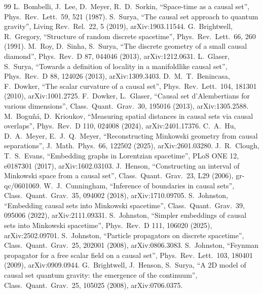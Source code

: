 \documentclass[11pt,a4paper]{article}
\begin{document}
\begin{thebibliography}{99}\small
{} L.~Bombelli, J.~Lee, D.~Meyer, R.~D.~Sorkin, ``Space-time as a causal set'', Phys.\ Rev.\ Lett.\ 59, 521 (1987).
 S.~Surya, ``The causal set approach to quantum gravity'', Living Rev.\ Rel.\ 22, 5 (2019), arXiv:1903.11544.
 G.~Brightwell, R.~Gregory, ``Structure of random discrete spacetime'', Phys.\ Rev.\ Lett.\ 66, 260 (1991).
 M.~Roy, D.~Sinha, S.~Surya, ``The discrete geometry of a small causal diamond'', Phys.\ Rev.\ D 87, 044046 (2013), arXiv:1212.0631.
 L.~Glaser, S.~Surya, ``Towards a definition of locality in a manifoldlike causal set'', Phys.\ Rev.\ D 88, 124026 (2013), arXiv:1309.3403.
 D.~M.~T.~Benincasa, F.~Dowker, ``The scalar curvature of a causal set'', Phys.\ Rev.\ Lett.\ 104, 181301 (2010), arXiv:1001.2725.
 F.~Dowker, L.~Glaser, ``Causal set d'Alembertians for various dimensions'', Class.\ Quant.\ Grav.\ 30, 195016 (2013), arXiv:1305.2588.
 M.~Bogu\~n\'a, D.~Krioukov, ``Measuring spatial distances in causal sets via causal overlaps'', Phys.\ Rev.\ D 110, 024008 (2024), arXiv:2401.17376.
 C.~A.~Hu, D.~A.~Meyer, E.~J.~Q.~Meyer, ``Reconstructing Minkowski geometry from causal separations'', J.\ Math.\ Phys.\ 66, 122502 (2025), arXiv:2601.03280.
 J.~R.~Clough, T.~S.~Evans, ``Embedding graphs in Lorentzian spacetime'', PLoS ONE 12, e0187301 (2017), arXiv:1602.03103.
 J.~Henson, ``Constructing an interval of Minkowski space from a causal set'', Class.\ Quant.\ Grav.\ 23, L29 (2006), gr-qc/0601069.
 W.~J.~Cunningham, ``Inference of boundaries in causal sets'', Class.\ Quant.\ Grav.\ 35, 094002 (2018), arXiv:1710.09705.
 S.~Johnston, ``Embedding causal sets into Minkowski spacetime'', Class.\ Quant.\ Grav.\ 39, 095006 (2022), arXiv:2111.09331.
 S.~Johnston, ``Simpler embeddings of causal sets into Minkowski spacetime'', Phys.\ Rev.\ D 111, 106020 (2025), arXiv:2502.09701.
 S.~Johnston, ``Particle propagators on discrete spacetime'', Class.\ Quant.\ Grav.\ 25, 202001 (2008), arXiv:0806.3083.
 S.~Johnston, ``Feynman propagator for a free scalar field on a causal set'', Phys.\ Rev.\ Lett.\ 103, 180401 (2009), arXiv:0909.0944.
 G.~Brightwell, J.~Henson, S.~Surya, ``A 2D model of causal set quantum gravity: the emergence of the continuum'', Class.\ Quant.\ Grav.\ 25, 105025 (2008), arXiv:0706.0375.

\end{thebibliography}
\end{document}
